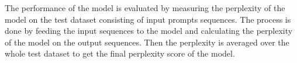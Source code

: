 The performance of the model is evaluated by measuring the perplexity of the model on the test dataset consisting of input prompts sequences. The process is done by feeding the input sequences to the model and calculating the perplexity of the model on the output sequences. Then the perplexity is averaged over the whole test dataset to get the final perplexity score of the model. \par
 
